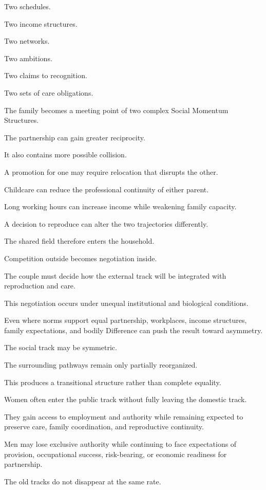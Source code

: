 Two schedules.

Two income structures.

Two networks.

Two ambitions.

Two claims to recognition.

Two sets of care obligations.

The family becomes a meeting point of two complex Social Momentum Structures.

The partnership can gain greater reciprocity.

It also contains more possible collision.

A promotion for one may require relocation that disrupts the other.

Childcare can reduce the professional continuity of either parent.

Long working hours can increase income while weakening family capacity.

A decision to reproduce can alter the two trajectories differently.

The shared field therefore enters the household.

Competition outside becomes negotiation inside.

The couple must decide how the external track will be integrated with reproduction and care.

This negotiation occurs under unequal institutional and biological conditions.

Even where norms support equal partnership, workplaces, income structures, family expectations, and bodily Difference can push the result toward asymmetry.

The social track may be symmetric.

The surrounding pathways remain only partially reorganized.

This produces a transitional structure rather than complete equality.

Women often enter the public track without fully leaving the domestic track.

They gain access to employment and authority while remaining expected to preserve care, family coordination, and reproductive continuity.

Men may lose exclusive authority while continuing to face expectations of provision, occupational success, risk-bearing, or economic readiness for partnership.

The old tracks do not disappear at the same rate.

